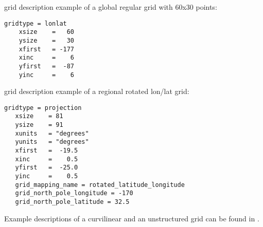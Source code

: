 \vspace{2mm}

{\CDO} grid description example of a global regular grid with 60x30 points:
\begin{lstlisting}[frame=single, backgroundcolor=\color{pcolor1}, basicstyle=\footnotesize]
    gridtype = lonlat
    xsize    =   60
    ysize    =   30
    xfirst   = -177
    xinc     =    6
    yfirst   =  -87
    yinc     =    6
\end{lstlisting}



\vspace{2mm}

{\CDO} grid description example of a regional rotated lon/lat grid:
\begin{lstlisting}[frame=single, backgroundcolor=\color{pcolor1}, basicstyle=\footnotesize]
   gridtype = projection
   xsize    = 81
   ysize    = 91
   xunits   = "degrees"
   yunits   = "degrees"
   xfirst   =  -19.5
   xinc     =    0.5
   yfirst   =  -25.0
   yinc     =    0.5
   grid_mapping_name = rotated_latitude_longitude
   grid_north_pole_longitude = -170
   grid_north_pole_latitude = 32.5
\end{lstlisting}

Example {\CDO} descriptions of a curvilinear and an unstructured grid can be found
in .









